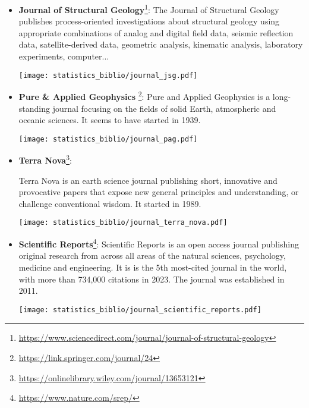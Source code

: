 \begin{itemize}
\item {\bf Journal of Structural Geology}\footnote{\url{https://www.sciencedirect.com/journal/journal-of-structural-geology}}:
The Journal of Structural Geology publishes process-oriented investigations about structural 
geology using appropriate combinations of analog and digital field data, seismic reflection data, 
satellite-derived data, geometric analysis, kinematic analysis, laboratory experiments, computer... 
\begin{center}
\texttt{[image: statistics\_biblio/journal\_jsg.pdf]}
\end{center}

\item {\bf Pure \& Applied Geophysics}
\footnote{\url{https://link.springer.com/journal/24}}:
Pure and Applied Geophysics is a long-standing journal focusing on the fields 
of solid Earth, atmospheric and oceanic sciences. 
It seems to have started in 1939.
\begin{center}
\texttt{[image: statistics\_biblio/journal\_pag.pdf]}
\end{center}

\item {\bf Terra Nova}\footnote{\url{https://onlinelibrary.wiley.com/journal/13653121}}:

Terra Nova is an earth science journal publishing short, innovative and 
provocative papers that expose new general principles and understanding, 
or challenge conventional wisdom. It started in 1989. 

\begin{center}
\texttt{[image: statistics\_biblio/journal\_terra\_nova.pdf]}
\end{center}

\item {\bf Scientific Reports}\footnote{\url{https://www.nature.com/srep/}}:
Scientific Reports is an open access journal publishing original research from across 
all areas of the natural sciences, psychology, medicine and engineering.
It is is the 5th most-cited journal in the world, with more than 734,000 citations in 2023.
The journal was established in 2011.


\begin{center}
\texttt{[image: statistics\_biblio/journal\_scientific\_reports.pdf]}
\end{center}


\end{itemize}
